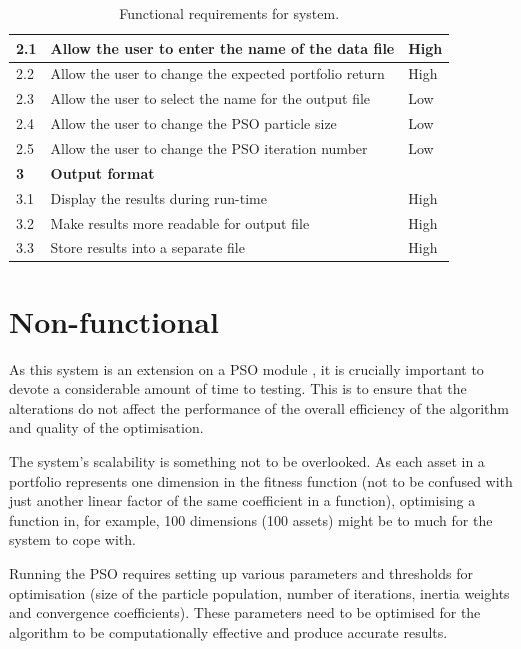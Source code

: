 \documentclass{pdfmx4020}
\begin{document}
\begin{table}[ht]
\begin{tabular}{|l|l|l|}
      2.1 & Allow the user to enter the name of the data file & High \\
      \hline
      2.2 & Allow the user to change the expected portfolio return & High \\
      \hline 
      2.3 & Allow the user to select the name for the output file & Low \\
      \hline 
      2.4 & Allow the user to change the PSO particle size & Low \\
      \hline 
      2.5 & Allow the user to change the PSO iteration number & Low \\
      \hline
      \textbf{3} &\textbf{Output format} & \\
      \hline 
      3.1 & Display the results during run-time & High \\
      \hline 
      3.2 & Make results more readable for output file & High \\
      \hline
      3.3 & Store results into a separate file & High \\
      \hline
    \end{tabular}
    \caption{Functional requirements for system.}
    \label{table:functionalRequirements}
  \end{table}
  

  \section{Non-functional} %
  \label{sec:non_functional}
    As this system is an extension on a PSO module \cite{haskellPSO}, it is crucially important to devote a considerable amount of time to testing. This is to ensure that the alterations do not affect the performance of the overall efficiency of the algorithm and quality of the optimisation.  

    The system's scalability is something not to be overlooked. As each asset in a portfolio represents one dimension in the fitness function (not to be confused with just another linear factor of the same coefficient in a function), optimising a function in, for example, 100 dimensions (100 assets) might be to much for the system to cope with. 

    Running the PSO requires setting up various parameters and thresholds for optimisation (size of the particle population, number of iterations, inertia weights and convergence coefficients). These parameters need to be optimised for the algorithm to be computationally effective and produce accurate results. 
\end{document}
